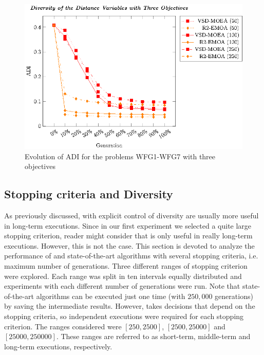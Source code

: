 %
%

\begin{figure}[t]
\centering
%
\includegraphics[scale=0.85]{Images/Graphic-Diversity_3obj_tikz-figure1.eps}
\caption{Evolution of ADI for the problems WFG1-WFG7 with three objectives}\label{fig:Diversity_3obj}
\end{figure}
%

\subsection{Stopping criteria and Diversity}

As previously discussed, \EAS{} with explicit control of diversity are usually more useful in long-term executions.
%
Since in our first experiment we selected a quite large stopping criterion, reader might consider that \VSDMOEA{} is only
useful in really long-term executions.
%
However, this is not the case.
%
This section is devoted to analyze the performance of \VSDMOEA{} and state-of-the-art algorithms with several stopping criteria, 
i.e. maximum number of generations.
%
Three different ranges of stopping criterion were explored.
%
Each range was split in ten intervals equally distributed and experiments with each different number of generations were run.
%
Note that state-of-the-art algorithms can be executed just one time (with $250,000$ generations) by saving the intermediate results.
%
However, \VSDMOEA{} takes decisions that depend on the stopping criteria, so independent executions were required for each stopping criterion.
%
The ranges considered were $[250, 2500]$, $[2500, 25000]$ and $[25000, 250000]$.
%
These ranges are referred to as short-term, middle-term and long-term executions, respectively.

